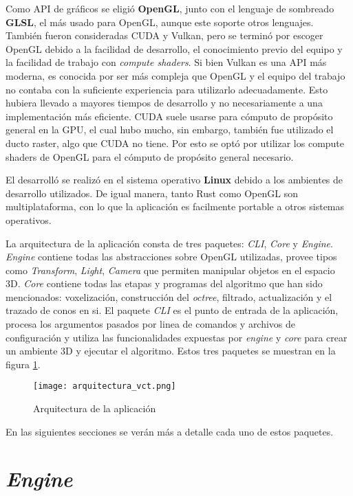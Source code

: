 Como API de gráficos se eligió \textbf{OpenGL}, junto con el lenguaje de sombreado \textbf{GLSL}, el más usado para OpenGL, aunque este soporte otros lenguajes.
También fueron consideradas CUDA y Vulkan, pero se terminó por escoger OpenGL debido a la facilidad de desarrollo, el conocimiento previo del equipo y la facilidad de trabajo con \textit{compute shaders}.
Si bien Vulkan es una API más moderna, es conocida por ser más compleja que OpenGL y el equipo del trabajo no contaba con la suficiente experiencia para utilizarlo adecuadamente.
Esto hubiera llevado a mayores tiempos de desarrollo y no necesariamente a una implementación más eficiente.
CUDA suele usarse para cómputo de propósito general en la GPU, el cual hubo mucho, sin embargo, también fue utilizado el ducto raster, algo que CUDA no tiene.
Por esto se optó por utilizar los compute shaders de OpenGL para el cómputo de propósito general necesario.

El desarrolló se realizó en el sistema operativo \textbf{Linux} debido a los ambientes de desarrollo utilizados.
De igual manera, tanto Rust como OpenGL son multiplataforma, con lo que la aplicación es facilmente portable a otros sistemas operativos.

La arquitectura de la aplicación consta de tres paquetes: \textit{CLI}, \textit{Core} y \textit{Engine}.
\textit{Engine} contiene todas las abstracciones sobre OpenGL utilizadas, provee tipos como \textit{Transform}, \textit{Light}, \textit{Camera} que permiten manipular objetos en el espacio 3D.
\textit{Core} contiene todas las etapas y programas del algoritmo que han sido mencionados: voxelización, construcción del \textit{octree}, filtrado, actualización y el trazado de conos en si.
El paquete \textit{CLI} es el punto de entrada de la aplicación, procesa los argumentos pasados por linea de comandos y archivos de configuración y utiliza las funcionalidades expuestas por \textit{engine} y \textit{core} para crear un ambiente 3D y ejecutar el algoritmo.
Estos tres paquetes se muestran en la figura \ref{fig:overall_architecture}.

\begin{figure}
    \centering
    \texttt{[image: arquitectura\_vct.png]}
    \caption{Arquitectura de la aplicación}
    \label{fig:overall_architecture}
\end{figure}

En las siguientes secciones se verán más a detalle cada uno de estos paquetes.

\section{\textit{Engine}}

